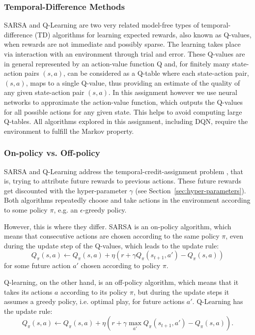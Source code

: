 \documentclass[conference]{IEEEtran}
\begin{document}
\subsubsection{Temporal-Difference Methods}
SARSA and Q-Learning are two very related model-free types of temporal-difference (TD) algorithms for learning expected rewards, also known as Q-values, when rewards are not immediate and possibly sparse. The learning takes place via interaction with an environment through trial and error. These Q-values are in general represented by an action-value function Q and, for finitely many state-action pairs $(s,a)$, can be considered as a Q-table where each state-action pair, $(s,a)$, maps to a single Q-value, thus providing an estimate of the quality of any given state-action pair $(s,a)$. In this assignment however we use neural networks to approximate the action-value function, which outputs the Q-values for all possible actions for any given state. This helps to avoid computing large Q-tables. All algorithms explored in this assignment, including DQN, require the environment to fulfill the Markov property.

\subsubsection{On-policy vs. Off-policy}
SARSA and Q-Learning address the temporal-credit-assignment problem \cite{sutton1984}, that is, trying to attribute future rewards to previous actions. These future rewards get discounted with the hyper-parameter $\gamma$ (see Section~\ref{sec:hyper-parameters}). Both algorithms repeatedly choose and take actions in the environment according to some policy $\pi$, e.g. an $\epsilon$-greedy policy.

However, this is where they differ.
SARSA is an on-policy algorithm, which means that consecutive actions are chosen according to the same policy $\pi$, even during the update step of the Q-values, which leads to the update rule: $$Q_\pi(s,a) \leftarrow Q_\pi(s,a) + \eta(r + \gamma Q_\pi(s_{t+1},a') - Q_\pi(s,a))$$ for some future action $a'$ chosen according to policy $\pi$.

Q-learning, on the other hand, is an off-policy algorithm, which means that it takes its actions $a$ according to its policy $\pi$, but during the update steps it assumes a greedy policy, i.e. optimal play, for future actions $a'$. 
Q-Learning has the update rule: $$Q_\pi(s,a) \leftarrow Q_\pi(s,a) + \eta(r + \gamma \max_{a'} Q_\pi(s_{t+1},a') - Q_\pi(s,a)).$$ 
\end{document}
